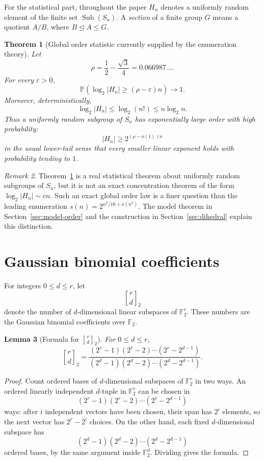 \documentclass[a4paper,11pt]{amsart}
\newtheorem{theorem}{Theorem}[section]
\newtheorem{lemma}[theorem]{Lemma}
\theoremstyle{remark}
\newtheorem{remark}[theorem]{Remark}
\newcommand{\Sub}{\operatorname{Sub}}
\newcommand{\F}{\mathbb F}
\newcommand{\Prob}{\mathbb P}
\newcommand{\gbinom}[2]{\genfrac{[}{]}{0pt}{}{#1}{#2}_2}
\begin{document}
For the statistical part, throughout the paper \(H_n\) denotes a uniformly random element of the
finite set \(\Sub(S_n)\). A \emph{section} of a finite group \(G\) means a quotient \(A/B\), where
\(B\trianglelefteq A\leq G\).

\begin{theorem}[Global order statistic currently supplied by the enumeration theory]\label{thm:global-order}
Let
\[
        \rho=\frac12-\frac{\sqrt3}{4}=0.066987\ldots .
\]
For every \(\varepsilon>0\),
\[
        \Prob\left(\log_2 |H_n|\geq (\rho-\varepsilon)n\right)\longrightarrow 1.
\]
Moreover, deterministically,
\[
        \log_2 |H_n|\leq \log_2(n!)\leq n\log_2 n.
\]
Thus a uniformly random subgroup of \(S_n\) has exponentially large order with high probability:
\[
        |H_n|\geq 2^{(\rho-o(1))n}
\]
in the usual lower-tail sense that every smaller linear exponent holds with probability tending to
\(1\).
\end{theorem}

\begin{remark}
Theorem~\ref{thm:global-order} is a real statistical theorem about uniformly random subgroups of
\(S_n\), but it is not an exact concentration theorem of the form \(\log_2|H_n|\sim c n\). Such an
exact global order law is a finer question than the leading enumeration
\(s(n)=2^{n^2/16+o(n^2)}\). The model theorem in Section~\ref{sec:model-order} and the
construction in Section~\ref{sec:dihedral} explain this distinction.
\end{remark}

\section{Gaussian binomial coefficients}

For integers \(0\leq d\leq r\), let
\[
        \gbinom{r}{d}
\]
denote the number of \(d\)-dimensional linear subspaces of \(\F_2^r\). These numbers are the
Gaussian binomial coefficients over \(\F_2\).

\begin{lemma}[Formula for \(\gbinom{r}{d}\)]\label{lem:gauss-formula}
For \(0\leq d\leq r\),
\[
        \gbinom{r}{d}
        =
        \frac{(2^r-1)(2^r-2)\cdots(2^r-2^{d-1})}
        {(2^d-1)(2^d-2)\cdots(2^d-2^{d-1})}.
\]
\end{lemma}

\begin{proof}
Count ordered bases of \(d\)-dimensional subspaces of \(\F_2^r\) in two ways. An ordered linearly
independent \(d\)-tuple in \(\F_2^r\) can be chosen in
\[
        (2^r-1)(2^r-2)\cdots(2^r-2^{d-1})
\]
ways: after \(i\) independent vectors have been chosen, their span has \(2^i\) elements, so the
next vector has \(2^r-2^i\) choices. On the other hand, each fixed \(d\)-dimensional subspace has
\[
        (2^d-1)(2^d-2)\cdots(2^d-2^{d-1})
\]
ordered bases, by the same argument inside \(\F_2^d\). Dividing gives the formula.
\end{proof}
\end{document}
